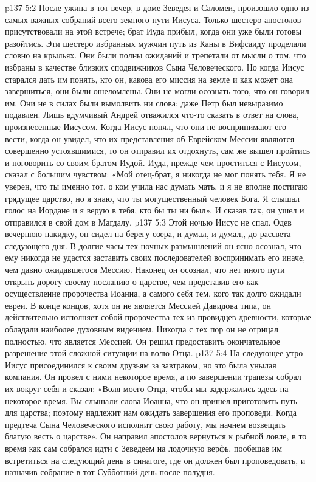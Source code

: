 \vs p137 5:2 После ужина в тот вечер, в доме Зеведея и Саломеи, произошло одно из самых важных собраний всего земного пути Иисуса. Только шестеро апостолов присутствовали на этой встрече; брат Иуда прибыл, когда они уже были готовы разойтись. Эти шестеро избранных мужчин путь из Каны в Вифсаиду проделали словно на крыльях. Они были полны ожиданий и трепетали от мысли о том, что избраны в качестве близких сподвижников Сына Человеческого. Но когда Иисус старался дать им понять, кто он, какова его миссия на земле и как может она завершиться, они были ошеломлены. Они не могли осознать того, что он говорил им. Они не в силах были вымолвить ни слова; даже Петр был невыразимо подавлен. Лишь вдумчивый Андрей отважился что\hyp{}то сказать в ответ на слова, произнесенные Иисусом. Когда Иисус понял, что они не воспринимают его вести, когда он увидел, что их представления об Еврейском Мессии являются совершенно устоявшимися, то он отправил их отдохнуть, сам же вышел пройтись и поговорить со своим братом Иудой. Иуда, прежде чем проститься с Иисусом, сказал с большим чувством: «Мой отец\hyp{}брат, я никогда не мог понять тебя. Я не уверен, что ты именно тот, о ком учила нас думать мать, и я не вполне постигаю грядущее царство, но я знаю, что ты могущественный человек Бога. Я слышал голос на Иордане и я верую в тебя, кто бы ты ни был». И сказав так, он ушел и отправился в свой дом в Магдалу.
\vs p137 5:3 Этой ночью Иисус не спал. Одев вечернюю накидку, он сидел на берегу озера, и думал, и думал,, до рассвета следующего дня. В долгие часы тех ночных размышлений он ясно осознал, что ему никогда не удастся заставить своих последователей воспринимать его иначе, чем давно ожидавшегося Мессию. Наконец он осознал, что нет иного пути открыть дорогу своему посланию о царстве, чем представив его как осуществление пророчества Иоанна, а самого себя тем, кого так долго ожидали евреи. В конце концов, хотя он не является Мессией Давидова типа, он действительно исполняет собой пророчества тех из провидцев древности, которые обладали наиболее духовным видением. Никогда с тех пор он не отрицал полностью, что является Мессией. Он решил предоставить окончательное разрешение этой сложной ситуации на волю Отца.
\vs p137 5:4 На следующее утро Иисус присоединился к своим друзьям за завтраком, но это была унылая компания. Он провел с ними некоторое время, а по завершении трапезы собрал их вокруг себя и сказал: «Воля моего Отца, чтобы мы задержались здесь на некоторое время. Вы слышали слова Иоанна, что он пришел приготовить путь для царства; поэтому надлежит нам ожидать завершения его проповеди. Когда предтеча Сына Человеческого исполнит свою работу, мы начнем возвещать благую весть о царстве». Он направил апостолов вернуться к рыбной ловле, в то время как сам собрался идти с Зеведеем на лодочную верфь, пообещав им встретиться на следующий день в синагоге, где он должен был проповедовать, и назначив собрание в тот Субботний день после полудня.
